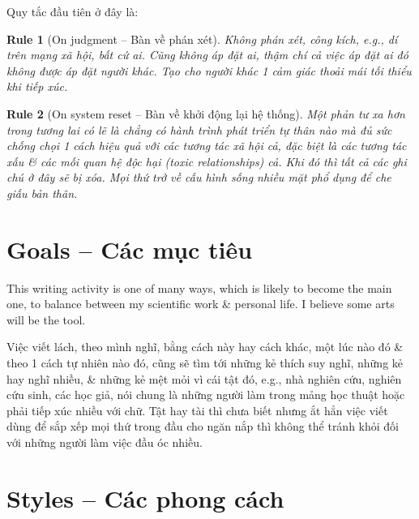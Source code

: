 \documentclass[12pt,oneside]{book}
\newtheorem{Rule}{Rule}
\begin{document}
Quy tắc đầu tiên ở đây là:
\begin{Rule}[On judgment -- Bàn về phán xét]
	Không phán xét, công kích, e.g., dí trên mạng xã hội, bất cứ ai. Cũng không áp đặt ai, thậm chí cả việc áp đặt ai đó không được áp đặt người khác. Tạo cho người khác 1 cảm giác thoải mái tối thiểu khi tiếp xúc.
\end{Rule}

\begin{Rule}[On system reset -- Bàn về khởi động lại hệ thống]
	Một phản tư xa hơn trong tương lai có lẽ là chẳng có hành trình phát triển tự thân nào mà đủ sức chống chọi 1 cách hiệu quả với các tương tác xã hội cả, đặc biệt là các tương tác xấu \& các mối quan hệ độc hại (toxic relationships) cả. Khi đó thì tất cả các ghi chú ở đây sẽ bị xóa. Mọi thứ trở về cấu hình sống nhiều mặt phổ dụng để che giấu bản thân.
\end{Rule} 

\section{Goals -- Các mục tiêu}
This writing activity is one of many ways, which is likely to become the main one, to balance between my scientific work \& personal life. I believe some arts will be the tool.

Việc viết lách, theo mình nghĩ, bằng cách này hay cách khác, một lúc nào đó \& theo 1 cách tự nhiên nào đó, cũng sẽ tìm tới những kẻ thích suy nghĩ, những kẻ hay nghĩ nhiều, \& những kẻ mệt mỏi vì cái tật đó, e.g., nhà nghiên cứu, nghiên cứu sinh, các học giả, nói chung là những người làm trong mảng học thuật hoặc phải tiếp xúc nhiều với chữ. Tật hay tài thì chưa biết nhưng ắt hẳn việc viết dùng để sắp xếp mọi thứ trong đầu cho ngăn nắp thì không thể tránh khỏi đối với những người làm việc đầu óc nhiều.

\section{Styles -- Các phong cách}
\end{document}
